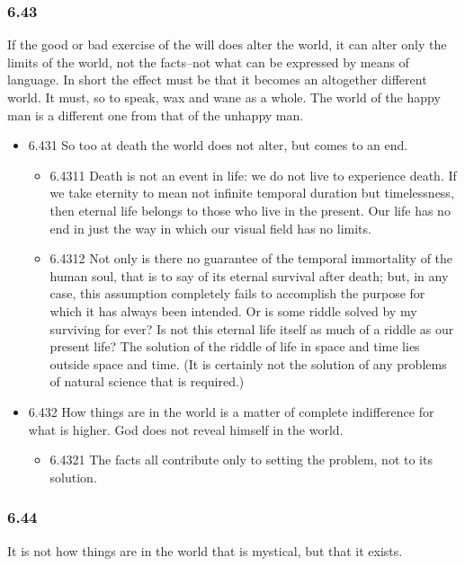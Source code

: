 \documentclass[11pt]{article}
\begin{document}
\subsubsection*{6.43}
\label{sec:org4d69e03}
If the good or bad exercise of the will does alter the world, it can
alter only the limits of the world, not the facts--not what can be
expressed by means of language. In short the effect must be that it becomes
an altogether different world. It must, so to speak, wax and wane as a
whole. The world of the happy man is a different one from that of the
unhappy man.
\begin{itemize}
\item 6.431
\label{sec:org35bb7df}
So too at death the world does not alter, but comes to an end.
\begin{itemize}
\item 6.4311
\label{sec:org8a31031}
Death is not an event in life: we do not live to experience death.
If we take eternity to mean not infinite temporal duration but
timelessness, then eternal life belongs to those who live in the present.
Our life has no end in just the way in which our visual field has no
limits.
\item 6.4312
\label{sec:orgaf98341}
Not only is there no guarantee of the temporal immortality of the
human soul, that is to say of its eternal survival after death; but, in any
case, this assumption completely fails to accomplish the purpose for which
it has always been intended. Or is some riddle solved by my surviving for
ever? Is not this eternal life itself as much of a riddle as our present
life? The solution of the riddle of life in space and time lies outside
space and time. (It is certainly not the solution of any problems of
natural science that is required.)
\end{itemize}
\item 6.432
\label{sec:orgf3c03e2}
How things are in the world is a matter of complete indifference for
what is higher. God does not reveal himself in the world.
\begin{itemize}
\item 6.4321
\label{sec:org2f45f3e}
The facts all contribute only to setting the problem, not to its
solution.
\end{itemize}
\end{itemize}
\subsubsection*{6.44}
\label{sec:orgf8dd843}
It is not how things are in the world that is mystical, but that it
exists.
\end{document}

